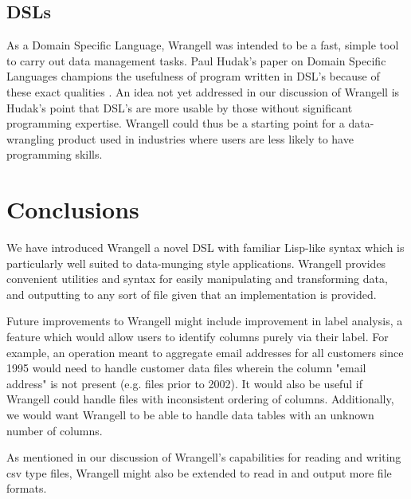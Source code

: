 \documentclass[preprint,nocopyrightspace]{sig-alternate}
\begin{document}
\subsection{DSLs}
As a Domain Specific Language, Wrangell was intended to be a fast, simple tool to carry out data management tasks. Paul Hudak's paper on Domain Specific Languages champions the usefulness of program written in DSL's because of these exact qualities \cite{DSLs}. An idea not yet addressed in our discussion of Wrangell is Hudak's point that DSL's are more usable by those without significant programming expertise. Wrangell could thus be a starting point for a data-wrangling product used in industries where users are less likely to have programming skills. 



\section{Conclusions}
We have introduced Wrangell a novel DSL with familiar Lisp-like syntax which is particularly well suited to  data-munging style applications. Wrangell provides convenient utilities and syntax for easily manipulating and transforming data, and outputting to any sort of file given that an implementation is provided.

Future improvements to Wrangell might include improvement in label analysis, a feature which would allow users to identify columns purely via their label. For example, an operation meant to aggregate email addresses for all customers since 1995 would need to handle customer data files wherein the column "email address" is not present (e.g. files prior to 2002). It would also be useful if Wrangell could handle files with inconsistent ordering of columns. Additionally, we would want Wrangell to be able to handle data tables with an unknown number of columns. 

As mentioned in our discussion of Wrangell's capabilities for reading and writing csv type files, Wrangell might also be extended to read in and output more file formats.  



\end{document}
